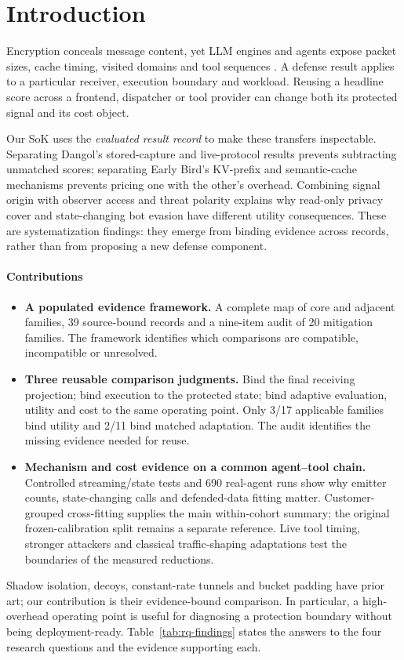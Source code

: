 \section{Introduction}\label{sec:introduction}
Encryption conceals message content, yet LLM engines and agents expose packet sizes, cache timing, visited domains and tool sequences \cite{weiss2024prompt,promptpeek2025,earlybird2025,agentprint2025,uitraces2026,jeong2026wra}. A defense result applies to a particular receiver, execution boundary and workload. Reusing a headline score across a frontend, dispatcher or tool provider can change both its protected signal and its cost object.

Our SoK uses the \emph{evaluated result record} to make these transfers inspectable. Separating Dangol's stored-capture and live-protocol results prevents subtracting unmatched scores; separating Early Bird's KV-prefix and semantic-cache mechanisms prevents pricing one with the other's overhead. Combining signal origin with observer access and threat polarity explains why read-only privacy cover and state-changing bot evasion have different utility consequences. These are systematization findings: they emerge from binding evidence across records, rather than from proposing a new defense component.

\paragraph{Contributions}
\begin{itemize}
\item \textbf{A populated evidence framework.} A complete map of \FinalCore{} core and \FinalAdjacent{} adjacent families, 39 source-bound records and a nine-item audit of 20 mitigation families. The framework identifies which comparisons are compatible, incompatible or unresolved.
\item \textbf{Three reusable comparison judgments.} Bind the final receiving projection; bind execution to the protected state; bind adaptive evaluation, utility and cost to the same operating point. Only 3/17 applicable families bind utility and 2/11 bind matched adaptation. The audit identifies the missing evidence needed for reuse.
\item \textbf{Mechanism and cost evidence on a common agent--tool chain.} Controlled streaming/state tests and 690 real-agent runs show why emitter counts, state-changing calls and defended-data fitting matter. Customer-grouped cross-fitting supplies the main within-cohort summary; the original frozen-calibration split remains a separate reference. Live tool timing, stronger attackers and classical traffic-shaping adaptations test the boundaries of the measured reductions.
\end{itemize}
Shadow isolation, decoys, constant-rate tunnels and bucket padding have prior art; our contribution is their evidence-bound comparison. In particular, a high-overhead operating point is useful for diagnosing a protection boundary without being deployment-ready. Table~\ref{tab:rq-findings} states the answers to the four research questions and the evidence supporting each.


